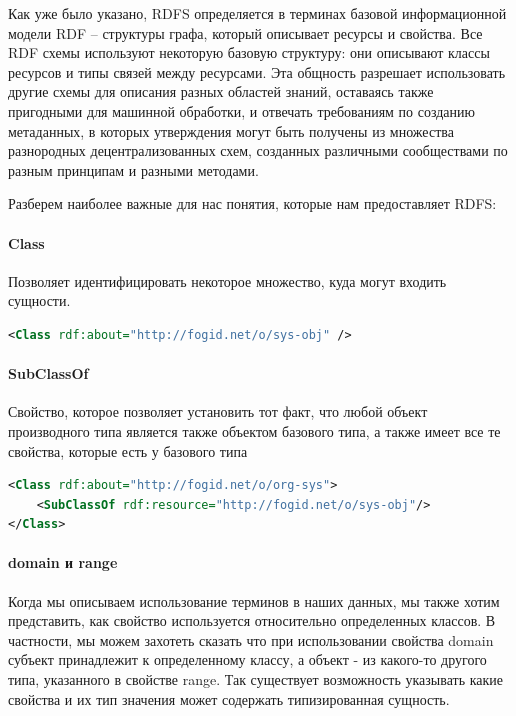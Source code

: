 \documentclass[12pt]{article}
\begin{document}
Как уже было указано, RDFS определяется в терминах базовой информационной модели RDF – структуры графа, который описывает ресурсы и свойства. Все RDF схемы используют некоторую базовую структуру: они описывают классы ресурсов и типы связей между ресурсами. Эта общность разрешает использовать другие схемы для описания разных областей знаний, оставаясь также пригодными для машинной обработки, и отвечать требованиям по созданию метаданных, в которых утверждения могут быть получены из множества разнородных децентрализованных схем, созданных различными сообществами по разным принципам и разными методами.\par

Разберем наиболее важные для нас понятия, которые нам предоставляет RDFS:

\paragraph{Class}
Позволяет идентифицировать некоторое множество, куда могут входить сущности.

\begin{lstlisting}[language=XML]
<Class rdf:about="http://fogid.net/o/sys-obj" />
\end{lstlisting}

\paragraph{SubClassOf}
Свойство, которое позволяет установить тот факт, что любой объект производного типа является также объектом базового типа, а также имеет все те свойства, которые есть у базового типа

\begin{lstlisting}[language=XML]
<Class rdf:about="http://fogid.net/o/org-sys">
    <SubClassOf rdf:resource="http://fogid.net/o/sys-obj"/>
</Class>
\end{lstlisting}

\paragraph{domain и range}
Когда мы описываем использование терминов в наших данных, мы также хотим представить, как свойство используется относительно определенных классов. В частности, мы можем захотеть сказать что при использовании свойства domain субъект принадлежит к определенному классу, а объект - из какого-то другого типа, указанного в свойстве range. Так существует возможность указывать какие свойства и их тип значения может содержать типизированная сущность.
\end{document}
